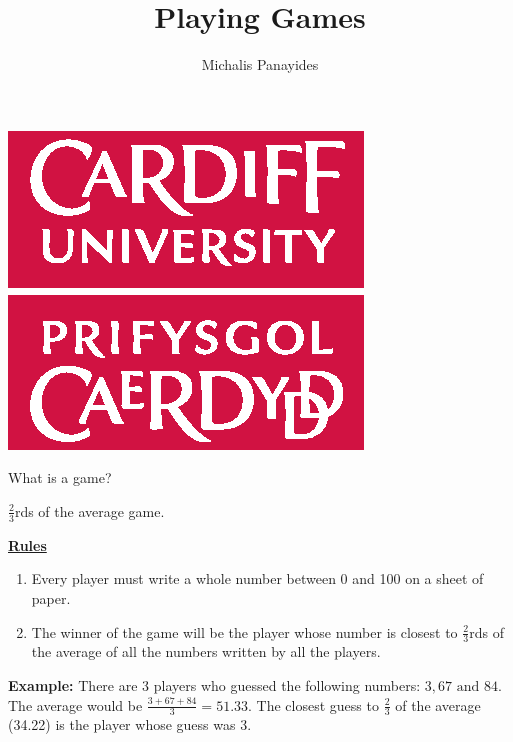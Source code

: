 \documentclass{beamer}
\title{Playing Games}
\author{Michalis Panayides}
\date{}
\begin{document}
\begin{frame}
    \maketitle
    \begin{center}
        \includegraphics[width=.3\textwidth]{Bin/CUident_CMYK.eps}
    \end{center}
\end{frame}

\begin{frame}
    \begin{center}
        \Large
        What is a game?
    \end{center}
\end{frame}

\begin{frame}
    \centering
    \Large
    \(\frac{2}{3}\)rds of the average game.

    \pause
    \vspace*{2cm}
    \scriptsize
    \underline{\textbf{Rules}}
    \begin{enumerate}
        \item Every player must write a whole number between 0 and 100 on a
        sheet of paper.
        \item The winner of the game will be the player whose number is closest
        to \(\frac{2}{3}\)rds of the average of all the numbers written by all
        the players.
    \end{enumerate}

    \vspace*{1cm}
    \textbf{Example:} There are 3 players who guessed the following numbers:
    \(3, 67 \text{ and } 84\).
    The average would be \(\frac{3 + 67 + 84}{3} = 51.33\).
    The closest guess to \(\frac{2}{3}\) of the average (34.22) is the player
    whose guess was 3.
\end{frame}

\begin{frame}
\end{frame}
\end{document}
